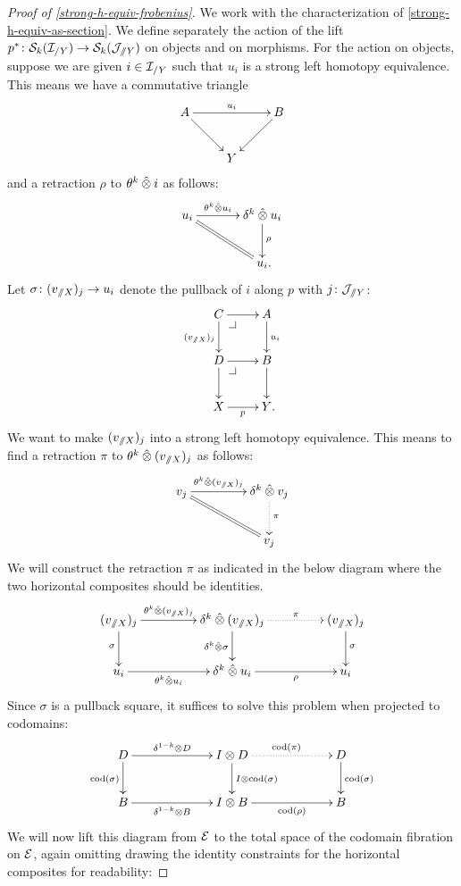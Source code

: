 \documentclass[reqno,10pt,a4paper,oneside,draft]{amsart}
\begin{document}
\begin{proof}[Proof of \cref{strong-h-equiv-frobenius}]
We work with the characterization of \cref{strong-h-equiv-as-section}.
We define separately the action of the lift $p^* \co \cal{S}_k(\cal{I}_{/Y}) \to \cal{S}_k(\cal{J}_{\fakeslice Y})$ on objects and on morphisms.
For the action on objects, suppose we are given $i \in \cal{I}_{/Y}$ such that $u_i$ is a strong left homotopy equivalence.
This means we have a commutative triangle
\[
\xymatrix{
  A
  \ar[rr]^{u_i}
  \ar[dr]
&&
  B
  \ar[dl]
\\&
  Y
}
\]
and a retraction $\rho$ to $\thetak \hatotimes i$ as follows:
\[
\xymatrix@C+1em{
  u_i
  \ar[r]^-{\thetak \hatotimes u_i}
  \ar@{=}[dr]
&
  \kcyl \hatotimes u_i \ar[d]^{\rho}
\\&
  u_i
\rlap{.}}
\]
Let $\sigma \co (v_{\fakeslice X})_{j} \to u_i$ denote the pullback of $i$ along $p$ with $j \co \cal{J}_{\fakeslice Y}$:
\[
\xymatrix{
  C
  \ar[r]
  \ar[d]_{(v_{\fakeslice X})_{j}}
  \pullback{dr}
&
  A
  \ar[d]^{u_i}
\\
  D
  \ar[r]
  \ar[d]
  \pullback{dr}
&
  B
  \ar[d]
\\
  X
  \ar[r]_p
&
  Y
\rlap{.}}
\]
We want to make $(v_{\fakeslice X})_j$ into a strong left homotopy equivalence.
This means to find a retraction $\pi$ to $\thetak \hatotimes (v_{\fakeslice X})_j$ as follows:
\[
\xymatrix@C+2em{
  v_{j}
  \ar[r]^-{\thetak \hatotimes (v_{\fakeslice X})_j}
  \ar@{=}[dr]
&
  \kcyl \hatotimes v_{j}
  \ar@{.>}[d]^{\pi}
\\&
  v_{j}
}
\]
We will construct the retraction $\pi$ as indicated in the below diagram where the two horizontal composites should be identities.
\[
\xymatrix@C+2em{
  (v_{\fakeslice X})_{j}
  \ar[r]^-{\thetak \hatotimes (v_{\fakeslice X})_j}
  \ar[d]_{\sigma}
&
  \kcyl \hatotimes (v_{\fakeslice X})_{j}
  \ar@{.>}[r]^-{\pi}
  \ar[d]_{\kcyl \hatotimes \sigma}
&
  (v_{\fakeslice X})_{j}
  \ar[d]^{\sigma}
\\
  u_i
  \ar[r]_-{\thetak \hatotimes u_i}
&
  \kcyl \hatotimes u_i
  \ar[r]_-{\rho}
&
  u_i
}
\]
Since $\sigma$ is a pullback square, it suffices to solve this problem when projected to codomains:
\[
\xymatrix@C+4em{
  D
  \ar[r]^-{\kcylinv \otimes D}
  \ar[d]_{\cod(\sigma)}
&
  \interval \otimes D
  \ar@{.>}[r]^{\cod(\pi)}
  \ar[d]^{\interval \otimes \cod(\sigma)}
&
  D
  \ar[d]^{\cod(\sigma)}
\\
  B
  \ar[r]_-{\kcylinv \otimes B}
&
  \interval \otimes B
  \ar[r]_-{\cod(\rho)}
&
  B
}
\]
We will now lift this diagram from $\catE$ to the total space of the codomain fibration on $\catE$, again omitting drawing the identity constraints for the horizontal composites for readability:

\end{proof}
\end{document}
